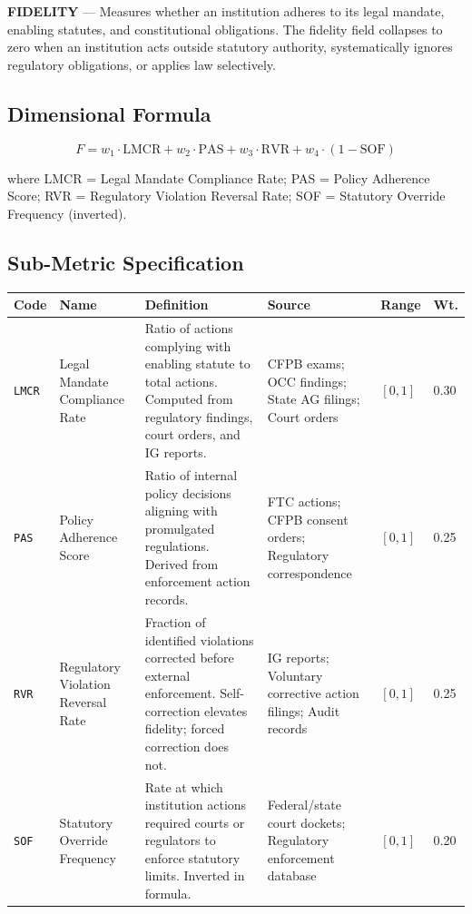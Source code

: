 \documentclass[a4paper,11pt]{article}
\begin{document}
	\begin{dimensionbox}
		\textbf{\sffamily FIDELITY} — Measures whether an institution adheres to its legal mandate, enabling statutes, and constitutional obligations. The fidelity field collapses to zero when an institution acts outside statutory authority, systematically ignores regulatory obligations, or applies law selectively.
	\end{dimensionbox}
	
	\subsection{Dimensional Formula}
	
	\[
	F = w_1 \cdot \text{LMCR} + w_2 \cdot \text{PAS} + w_3 \cdot \text{RVR} + w_4 \cdot (1 - \text{SOF})
	\]
	
	\noindent where LMCR = Legal Mandate Compliance Rate; PAS = Policy Adherence Score; RVR = Regulatory Violation Reversal Rate; SOF = Statutory Override Frequency (inverted).
	
	\subsection{Sub-Metric Specification}
	
	\begin{longtable}{L{1.1cm} L{1.9cm} L{4.5cm} L{3.5cm} C{1.1cm} C{1.1cm}}
		\toprule
		\color{white}\textbf{\sffamily Code} & \color{white}\textbf{\sffamily Name} & \color{white}\textbf{\sffamily Definition} & \color{white}\textbf{\sffamily Source} & \color{white}\textbf{\sffamily Range} & \color{white}\textbf{\sffamily Wt.} \\
		\midrule
		\endhead
		\texttt{LMCR} & Legal Mandate Compliance Rate & Ratio of actions complying with enabling statute to total actions. Computed from regulatory findings, court orders, and IG reports. & CFPB exams; OCC findings; State AG filings; Court orders & $[0,1]$ & 0.30 \\
		\midrule
		\texttt{PAS} & Policy Adherence Score & Ratio of internal policy decisions aligning with promulgated regulations. Derived from enforcement action records. & FTC actions; CFPB consent orders; Regulatory correspondence & $[0,1]$ & 0.25 \\
		\midrule
		\texttt{RVR} & Regulatory Violation Reversal Rate & Fraction of identified violations corrected before external enforcement. Self-correction elevates fidelity; forced correction does not. & IG reports; Voluntary corrective action filings; Audit records & $[0,1]$ & 0.25 \\
		\midrule
		\texttt{SOF} & Statutory Override Frequency & Rate at which institution actions required courts or regulators to enforce statutory limits. Inverted in formula. & Federal/state court dockets; Regulatory enforcement database & $[0,1]$ & 0.20 \\
		\bottomrule
	\end{longtable}
	
\end{document}
